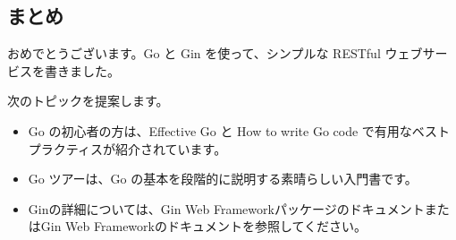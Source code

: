 \subsection{まとめ}

おめでとうございます。Go と Gin を使って、シンプルな RESTful
ウェブサービスを書きました。

次のトピックを提案します。

\begin{itemize}

\item
  Go の初心者の方は、Effective Go と How to write Go code で有用なベスト
  プラクティスが紹介されています。
\item
  Go ツアーは、Go の基本を段階的に説明する素晴らしい入門書です。
\item
  Ginの詳細については、Gin Web
  FrameworkパッケージのドキュメントまたはGin Web
  Frameworkのドキュメントを参照してください。
\end{itemize}
